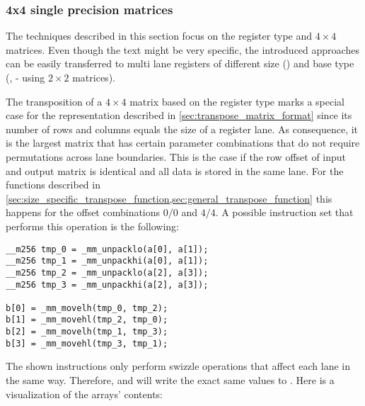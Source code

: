 \subsubsection{4x4 single precision matrices}
\label{sec:Implementation_4x4_matrices}

The techniques described in this section focus on the  register type and $4 \times 4$ matrices.
Even though the text might be very specific, the introduced approaches can be easily transferred to multi lane registers of different size () and base type (,  - using $2 \times 2$ matrices).

The transposition of a $4 \times 4$ matrix based on the  register type marks a special case for the representation described in \cref{sec:transpose_matrix_format} since its number of rows and columns equals the size of a register lane.
As consequence, it is the largest matrix that has certain parameter combinations that do not require permutations across lane boundaries.
This is the case if the row offset of input and output matrix is identical and all data is stored in the same lane.
For the functions described in \cref{sec:size_specific_transpose_function,sec:general_transpose_function} this happens for the offset combinations $0/0$ and $4/4$.
A possible instruction set that performs this operation is the following:

\begin{verbatim}
__m256 tmp_0 = _mm_unpacklo(a[0], a[1]);
__m256 tmp_1 = _mm_unpackhi(a[0], a[1]);
__m256 tmp_2 = _mm_unpacklo(a[2], a[3]);
__m256 tmp_3 = _mm_unpackhi(a[2], a[3]);

b[0] = _mm_movelh(tmp_0, tmp_2);
b[1] = _mm_movehl(tmp_2, tmp_0);
b[2] = _mm_movelh(tmp_1, tmp_3);
b[3] = _mm_movehl(tmp_3, tmp_1);
\end{verbatim}

The shown instructions only perform swizzle operations that affect each lane in the same way.
Therefore,  and  will write the exact same values to .
Here is a visualization of the arrays' contents:


